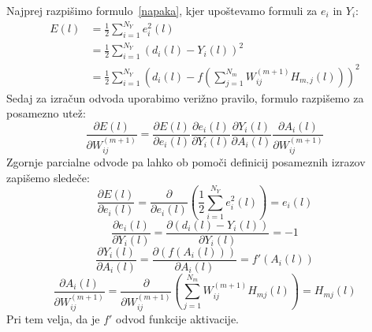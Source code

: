 \documentclass[mat1]{fmfdelo}
\begin{document}
Najprej razpišimo formulo~\eqref{napaka}, kjer upoštevamo formuli za $e_i$ in $Y_i$:
\begin{equation*}
\begin{aligned}
E(l) &= \frac{1}{2}\sum^{N_Y}_{i=1}e_i^2(l) \\
&=\frac{1}{2}\sum^{N_Y}_{i=1}{\left(d_i(l) - Y_i(l)\right)}^2 \\
&= \frac{1}{2}\sum^{N_Y}_{i=1}\left(d_i(l)-f\left(\sum^{N_m}_{j=1}W^{(m+1)}_{ij}H_{m,j}(l)\right)\right)^2
\end{aligned}
\end{equation*}
%
 Sedaj za izračun odvoda uporabimo verižno pravilo,  formulo razpišemo za posamezno utež:
%
\begin{equation}
\frac{\partial E(l)}{\partial W^{(m+1)}_{ij}} = \frac{\partial E(l)}{\partial e_i(l)}
\frac{\partial e_i(l)}{\partial Y_i(l)} 
\frac{\partial Y_i(l)}{\partial A_i(l)}
\frac{\partial A_i(l)}{\partial W^{(m+1)}_{ij}}
\end{equation}
%
Zgornje parcialne odvode pa lahko ob pomoči definicij posameznih izrazov zapišemo sledeče:
%
\begin{equation}
\frac{\partial E(l)}{\partial e_i(l)} = \frac{\partial}{\partial e_i(l)}\left(\frac{1}{2}\sum^{N_Y}_{i=1}e_i^2(l)\right)=e_i(l)
\end{equation}
%
\begin{equation}
\frac{\partial e_i(l)}{\partial Y_i(l)}= \frac{\partial (d_i(l) - Y_i(l))}{\partial Y_i(l)} = -1
\end{equation}
%
\begin{equation}
\frac{\partial Y_i(l)}{\partial A_i(l)} = \frac{\partial (f(A_i(l))) }{\partial A_i(l)} =f'(A_i(l))
\end{equation}
%
\begin{equation}
\frac{\partial A_i(l)}{\partial W^{(m+1)}_{ij}} =\frac{\partial}{\partial W^{(m+1)}_{ij}} \left(\sum^{N_m}_{j=1}W_{ij}^{(m+1)}H_{mj}(l)\right) = H_{mj}(l)
\end{equation}
%
Pri tem velja, da je $f'$ odvod funkcije aktivacije. 
\end{document}
